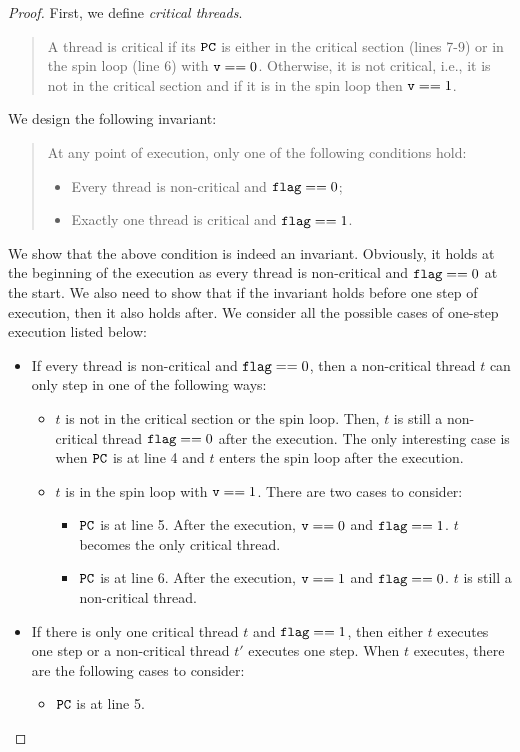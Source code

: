 \documentclass{article}[10pt]
\newcommand{\kwd}[1]{\ensuremath{\text{\ttfamily #1}}\xspace}
\def\kflag{\kwd{flag}}
\def\kv{\kwd{v}}
\begin{document}
\begin{proof}
  First, we define \emph{critical threads}. 
  \begin{quote}
    A thread is critical if its \kwd{PC} is either in the critical
    section (lines 7-9) or in the spin loop (line 6) with $\kv ==
    0$. Otherwise, it is not critical, i.e., it is not in the critical
    section and if it is in the spin loop then $\kv == 1$.
  \end{quote}
  We design the following invariant:
  \begin{quote}
    At any point of execution, only one of the following conditions hold:
    \begin{itemize}
    \item Every thread is non-critical and $\kflag == 0$;
    \item Exactly one thread is critical and $\kflag == 1$.
    \end{itemize}
  \end{quote}
  We show that the above condition is indeed an
  invariant. Obviously, it holds at the beginning of the execution as
  every thread is non-critical and $\kflag == 0$ at the start. We also
  need to show that if the invariant holds before one step of
  execution, then it also holds after. We consider all the possible cases
  of one-step execution listed below:
  \begin{itemize}
  \item If every thread is non-critical and $\kflag == 0$, then a
    non-critical thread $t$ can only step in one of the following ways:
    \begin{itemize}
    \item $t$ is not in the critical section or the spin loop. Then,
      $t$ is still a non-critical thread $\kflag == 0$ after the
      execution. The only interesting case is when \kwd{PC} is at line
      4 and $t$ enters the spin loop after the execution.

    \item $t$ is in the spin loop with $\kv == 1$. There are two cases
      to consider:
      \begin{itemize}
      \item \kwd{PC} is at line 5. After the execution, $\kv == 0$ and
        $\kflag == 1$. $t$ becomes the only critical thread.
      \item \kwd{PC} is at line 6. After the execution, $\kv == 1$ and
        $\kflag == 0$. $t$ is still a non-critical thread.
      \end{itemize}

    \end{itemize}
    
  \item If there is only one critical thread $t$ and $\kflag == 1$,
    then either $t$ executes one step or a non-critical thread $t'$
    executes one step. When $t$ executes, there are the following
    cases to consider:
    \begin{itemize}
    \item \kwd{PC} is at line 5.
    \end{itemize}
    

  \end{itemize}
\end{proof}
\end{document}
